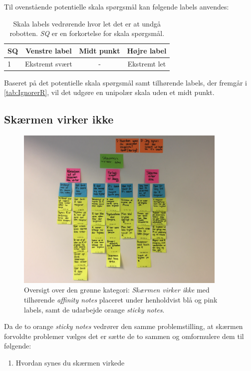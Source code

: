\noindent
%
Til ovenstående potentielle skala spørgsmål kan følgende labels anvendes:
%
\begin{table}[H]
	\centering
	\begin{tabular}{l|c|c|c}
		SQ     & Venstre label & Midt punkt & Højre label \\\hline
		1   & Ekstremt svært & - & Ekstremt let                 
	\end{tabular}
\caption{Skala labels vedrørende hvor let det er at undgå robotten. \textit{SQ} er en forkortelse for skala spørgsmål.}
	\label{tab:IgnorerR} 
\end{table}
\noindent
%
Baseret på det potentielle skala spørgsmål samt tilhørende labels, der fremgår i \autoref{tab:IgnorerR}, vil det udgøre en unipolær skala uden et midt punkt. 
%
\newpage
\subsection{Skærmen virker ikke}
\label{ParametreSkaermenVirkerIkke}
%
\begin{figure}[H]
\centering
\includegraphics[width = 0.9\textwidth]{Figure/AffinityDiagram/SkaermenVirkerIkke} 
\caption{Oversigt over den grønne kategori: \textit{Skærmen virker ikke} med tilhørende \textit{affinity notes} placeret under henholdvist blå og pink labels, samt de udarbejde orange \textit{sticky notes}.}
\label{fig:AFSkaermVirkerIkke}
\end{figure}
\noindent
%
Da de to orange \textit{sticky notes} vedrører den samme problemstilling, at skærmen forvoldte problemer vælges det er sætte de to sammen og omformulere dem til følgende:\blankline
%
\begin{enumerate}
  \item Hvordan synes du skærmen virkede\blankline
\end{enumerate}
